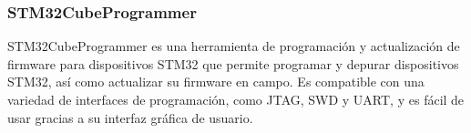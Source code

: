 \subsubsection{STM32CubeProgrammer}

STM32CubeProgrammer \citep{stm32-cubeprogrammer} es una herramienta de programación y actualización de firmware para dispositivos STM32 que permite programar y depurar dispositivos STM32, así como actualizar su firmware en campo. Es compatible con una variedad de interfaces de programación, como JTAG, SWD y UART, y es fácil de usar gracias a su interfaz gráfica de usuario. 



